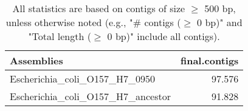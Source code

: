 \documentclass[12pt,a4paper]{article}
\begin{document}
\begin{table}[ht]
\begin{center}
\caption{All statistics are based on contigs of size $\geq$ 500 bp, unless otherwise noted (e.g., "\# contigs ($\geq$ 0 bp)" and "Total length ($\geq$ 0 bp)" include all contigs).}
\begin{tabular}{|l*{1}{|r}|}
\hline
Assemblies & final.contigs \\ \hline
Escherichia\_coli\_O157\_H7\_0950 & 97.576 \\ \hline
Escherichia\_coli\_O157\_H7\_ancestor & 91.828 \\ \hline
\end{tabular}
\end{center}
\end{table}
\end{document}
